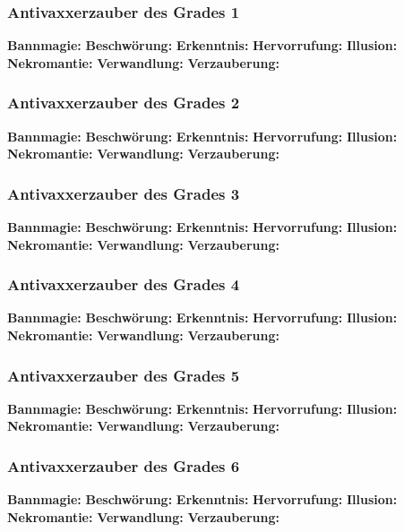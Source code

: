 \documentclass[
	ngerman,
	a4paper,
	10pt,
	twocolumn,
]{scrartcl}
\begin{document}
\subsubsection*{Antivaxxerzauber des Grades 1}

\textbf{Bannmagie:} \textit{}
\textbf{Beschwörung:} \textit{}
\textbf{Erkenntnis:} \textit{}
\textbf{Hervorrufung:} \textit{}
\textbf{Illusion:} \textit{}
\textbf{Nekromantie:} \textit{}
\textbf{Verwandlung:} \textit{}
\textbf{Verzauberung:} \textit{}

\subsubsection*{Antivaxxerzauber des Grades 2}

\textbf{Bannmagie:} \textit{}
\textbf{Beschwörung:} \textit{}
\textbf{Erkenntnis:} \textit{}
\textbf{Hervorrufung:} \textit{}
\textbf{Illusion:} \textit{}
\textbf{Nekromantie:} \textit{}
\textbf{Verwandlung:} \textit{}
\textbf{Verzauberung:} \textit{}

\subsubsection*{Antivaxxerzauber des Grades 3}

\textbf{Bannmagie:} \textit{}
\textbf{Beschwörung:} \textit{}
\textbf{Erkenntnis:} \textit{}
\textbf{Hervorrufung:} \textit{}
\textbf{Illusion:} \textit{}
\textbf{Nekromantie:} \textit{}
\textbf{Verwandlung:} \textit{}
\textbf{Verzauberung:} \textit{}

\subsubsection*{Antivaxxerzauber des Grades 4}

\textbf{Bannmagie:} \textit{}
\textbf{Beschwörung:} \textit{}
\textbf{Erkenntnis:} \textit{}
\textbf{Hervorrufung:} \textit{}
\textbf{Illusion:} \textit{}
\textbf{Nekromantie:} \textit{}
\textbf{Verwandlung:} \textit{}
\textbf{Verzauberung:} \textit{}

\subsubsection*{Antivaxxerzauber des Grades 5}

\textbf{Bannmagie:} \textit{}
\textbf{Beschwörung:} \textit{}
\textbf{Erkenntnis:} \textit{}
\textbf{Hervorrufung:} \textit{}
\textbf{Illusion:} \textit{}
\textbf{Nekromantie:} \textit{}
\textbf{Verwandlung:} \textit{}
\textbf{Verzauberung:} \textit{}

\subsubsection*{Antivaxxerzauber des Grades 6}

\textbf{Bannmagie:} \textit{}
\textbf{Beschwörung:} \textit{}
\textbf{Erkenntnis:} \textit{}
\textbf{Hervorrufung:} \textit{}
\textbf{Illusion:} \textit{}
\textbf{Nekromantie:} \textit{}
\textbf{Verwandlung:} \textit{}
\textbf{Verzauberung:} \textit{}
\end{document}
